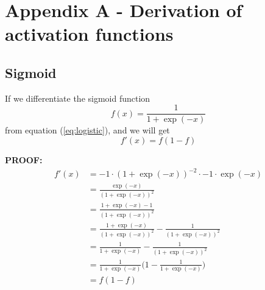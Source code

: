 \section{Appendix A - Derivation of activation functions} \label{sec:appendixa}

\subsection{Sigmoid} \label{sec:sigmoid_der}
If we differentiate the sigmoid function 
\begin{equation}
f(x)=\frac{1}{1+\exp(-x)}
\end{equation}
from equation (\ref{eq:logistic}), and we will get
\begin{equation}
f'(x)=f(1-f)
\end{equation}

\textbf{PROOF:}
\begin{align*}
f'(x) &= -1\cdot(1+\exp(-x))^{-2}\cdot -1\cdot\exp(-x)\\
&=\frac{\exp(-x)}{(1+\exp(-x))^{2}}\\
&=\frac{1+\exp(-x)-1}{(1+\exp(-x))^{2}}\\
&=\frac{1+\exp(-x)}{(1+\exp(-x))^{2}} - \frac{1}{(1+\exp(-x))^{2}}\\
&=\frac{1}{1+\exp(-x)} - \frac{1}{(1+\exp(-x))^{2}}\\
&=\frac{1}{1+\exp(-x)}\bigg(1 - \frac{1}{1+\exp(-x)}\bigg)\\
&=f(1-f)
\end{align*}